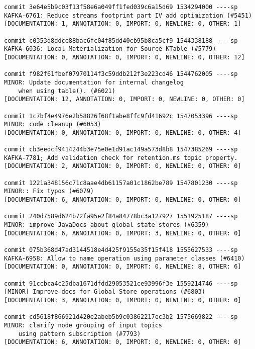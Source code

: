 \begin{mdframed}
\begin{lstlisting}
commit 3e64e5b9c03f13f58e6a049ff1fed039c6a15d69 1534294000 ----sp
KAFKA-6761: Reduce streams footprint part IV add optimization (#5451)                               
[DOCUMENTATION: 1, ANNOTATION: 0, IMPORT: 0, NEWLINE: 0, OTHER: 1]

commit c0353d8ddce88bac6fc04f85dd40cb95b8ca5cf9 1544338188 ----sp
KAFKA-6036: Local Materialization for Source KTable (#5779)                                         
[DOCUMENTATION: 0, ANNOTATION: 0, IMPORT: 0, NEWLINE: 0, OTHER: 12]

commit f982f61fbef07970114f3c59ddb212f3e223cd46 1544762005 ----sp
MINOR: Update documentation for internal changelog 
    when using table(). (#6021)
[DOCUMENTATION: 12, ANNOTATION: 0, IMPORT: 0, NEWLINE: 0, OTHER: 0]

commit 1c7bf4e4976e2b58826f68f1abe8ffc9fd41692c 1547053396 ----sp
MINOR: code cleanup (#6053)                                                                         
[DOCUMENTATION: 0, ANNOTATION: 0, IMPORT: 0, NEWLINE: 0, OTHER: 4]

commit cb3eedcf9414244b3e75e0e1d91ac149a573d8b8 1547385269 ----sp
KAFKA-7781; Add validation check for retention.ms topic property.                                   
[DOCUMENTATION: 2, ANNOTATION: 0, IMPORT: 0, NEWLINE: 0, OTHER: 0]

commit 1221a348156c71c8aae4db61157a01c1862be789 1547801230 ----sp
MINOR:: Fix typos (#6079)                                                                           
[DOCUMENTATION: 6, ANNOTATION: 0, IMPORT: 0, NEWLINE: 0, OTHER: 0]

commit 240d7589d624b72fa95e2f84a84778bc3a127927 1551925187 ----sp
MINOR: improve JavaDocs about global state stores (#6359)                                           
[DOCUMENTATION: 6, ANNOTATION: 0, IMPORT: 3, NEWLINE: 0, OTHER: 0]

commit 075b368d47ad3144518e4d425f9155e35f15f418 1555627533 ----sp
KAFKA-6958: Allow to name operation using parameter classes (#6410)                                 
[DOCUMENTATION: 0, ANNOTATION: 0, IMPORT: 0, NEWLINE: 8, OTHER: 6]

commit 91ccbca4c25dba1671dfdd29053521ce93996f3e 1559214746 ----sp
[MINOR] Improve docs for Global Store operations (#6803)                                            
[DOCUMENTATION: 3, ANNOTATION: 0, IMPORT: 0, NEWLINE: 0, OTHER: 0]

commit cd5618f866921d420e2abeb5b9c03862217ec3b2 1575669822 ----sp
MINOR: clarify node grouping of input topics 
    using pattern subscription (#7793)
[DOCUMENTATION: 6, ANNOTATION: 0, IMPORT: 0, NEWLINE: 0, OTHER: 0]


\end{lstlisting}
\end{mdframed}

